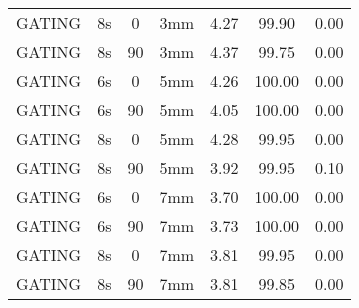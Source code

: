 \begin{table}[H]
\begin{tabular}{|c||c|c|c||c|c|c|}
GATING & 8s & 0 & 3mm & 4.27 & 99.90 & 0.00 \\
GATING & 8s & 90 & 3mm & 4.37 & 99.75 & 0.00 \\
GATING & 6s & 0 & 5mm & 4.26 & 100.00 & 0.00 \\
GATING & 6s & 90 & 5mm & 4.05 & 100.00 & 0.00 \\
GATING & 8s & 0 & 5mm & 4.28 & 99.95 & 0.00 \\
GATING & 8s & 90 & 5mm & 3.92 & 99.95 & 0.10 \\
GATING & 6s & 0 & 7mm & 3.70 & 100.00 & 0.00 \\
GATING & 6s & 90 & 7mm & 3.73 & 100.00 & 0.00 \\
GATING & 8s & 0 & 7mm & 3.81 & 99.95 & 0.00 \\
GATING & 8s & 90 & 7mm & 3.81 & 99.85 & 0.00 \\
    \hline\hline 
  \end{tabular}
\end{table}

\newpage

